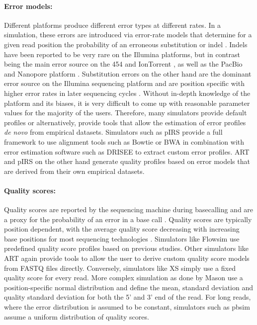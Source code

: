 \paragraph{Error models:} Different platforms produce different error types at different rates. In a simulation, these errors are introduced via error-rate models that determine for a given read position the probability of an erroneous substitution or indel \citep{Escalona2016}. Indels have been reported to be very rare on the Illumina platforms, but in contrast being the main error source on the 454 and IonTorrent \citep{Dohm2008}, as well as the PacBio \citep{Loman2012} and Nanopore platform \citep{Ono2013}. Substitution errors on the other hand are the dominant error source on the Illumina sequencing platform \citep{Hu2012} and are position specific with higher error rates in later sequencing cycles \citep{Metzker2010SequencingGeneration}. Without in-depth knowledge of the platform and its biases, it is very difficult to come up with reasonable parameter values for the majority of the users. Therefore, many simulators provide default profiles or alternatively, provide tools that allow the estimation of error profiles \textit{de novo} from empirical datasets. Simulators such as pIRS provide a full framework to use alignment tools such as Bowtie or BWA in combination with error estimation software such as DRISEE \citep{Keegan2012} to extract custom error profiles. ART and pIRS on the other hand generate quality profiles based on error models that are derived from their own empirical datasets.

\paragraph{Quality scores:} Quality scores are reported by the sequencing machine during basecalling and are a proxy for the probability of an error in a base call \citep{Ewing1998,Ewing1998a}. Quality scores are typically position dependent, with the average quality score decreasing with increasing base positions for most sequencing technologies \citep{Huang2012}. Simulators like Flowsim \citep{Balzer2010} use predefined quality score profiles based on previous studies. Other simulators like ART again provide tools to allow the user to derive custom quality score models from FASTQ files directly. Conversely, simulators like XS simply use a fixed quality score for every read. More complex simulation as done by Mason \citep{Holtgrewe2010} use a position-specific normal distribution and define the mean, standard deviation and quality standard deviation for both the 5' and 3' end of the read. For long reads, where the error distribution is assumed to be constant, simulators such as pbsim \citep{Ono2013} assume a uniform distribution of quality scores.

